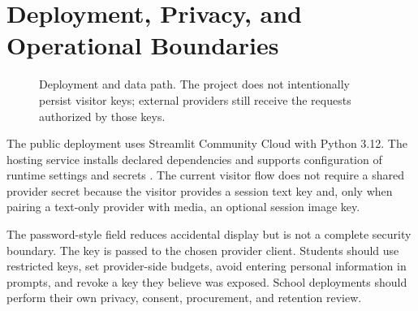 \documentclass[11pt]{article}
\newcommand{\code}[1]{\texttt{#1}}
\theoremstyle{plain}
\theoremstyle{definition}
\begin{document}
\section{Deployment, Privacy, and Operational Boundaries}

\begin{figure}[H]
\centering
{}
\caption{Deployment and data path. The project does not intentionally persist visitor keys; external providers still receive the requests authorized by those keys.}
\label{fig:deployment}
\end{figure}

The public deployment uses Streamlit Community Cloud with Python 3.12. The hosting service installs declared dependencies and supports configuration of runtime settings and secrets \citep{streamlitDeploy,streamlitSecrets}. The current visitor flow does not require a shared provider secret because the visitor provides a session text key and, only when pairing a text-only provider with media, an optional session image key.

The password-style field reduces accidental display but is not a complete security boundary. The key is passed to the chosen provider client. Students should use restricted keys, set provider-side budgets, avoid entering personal information in prompts, and revoke a key they believe was exposed. School deployments should perform their own privacy, consent, procurement, and retention review.
\end{document}
